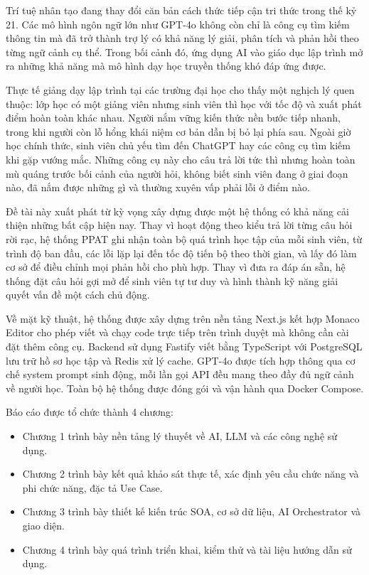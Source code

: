 \documentclass[../main.tex]{subfiles}
\begin{document}
Trí tuệ nhân tạo đang thay đổi căn bản cách thức tiếp cận tri thức trong thế kỷ 21. Các mô hình ngôn ngữ lớn như GPT-4o không còn chỉ là công cụ tìm kiếm thông tin mà đã trở thành trợ lý có khả năng lý giải, phân tích và phản hồi theo từng ngữ cảnh cụ thể. Trong bối cảnh đó, ứng dụng AI vào giáo dục lập trình mở ra những khả năng mà mô hình dạy học truyền thống khó đáp ứng được.

Thực tế giảng dạy lập trình tại các trường đại học cho thấy một nghịch lý quen thuộc: lớp học có một giảng viên nhưng sinh viên thì học với tốc độ và xuất phát điểm hoàn toàn khác nhau. Người nắm vững kiến thức nền bước tiếp nhanh, trong khi người còn lỗ hổng khái niệm cơ bản dần bị bỏ lại phía sau. Ngoài giờ học chính thức, sinh viên chủ yếu tìm đến ChatGPT hay các công cụ tìm kiếm khi gặp vướng mắc. Những công cụ này cho câu trả lời tức thì nhưng hoàn toàn mù quáng trước bối cảnh của người hỏi, không biết sinh viên đang ở giai đoạn nào, đã nắm được những gì và thường xuyên vấp phải lỗi ở điểm nào.

Đề tài này xuất phát từ kỳ vọng xây dựng được một hệ thống có khả năng cải thiện những bất cập hiện nay. Thay vì hoạt động theo kiểu trả lời từng câu hỏi rời rạc, hệ thống PPAT ghi nhận toàn bộ quá trình học tập của mỗi sinh viên, từ trình độ ban đầu, các lỗi lặp lại đến tốc độ tiến bộ theo thời gian, và lấy đó làm cơ sở để điều chỉnh mọi phản hồi cho phù hợp. Thay vì đưa ra đáp án sẵn, hệ thống đặt câu hỏi gợi mở để sinh viên tự tư duy và hình thành kỹ năng giải quyết vấn đề một cách chủ động.

Về mặt kỹ thuật, hệ thống được xây dựng trên nền tảng Next.js kết hợp Monaco Editor cho phép viết và chạy code trực tiếp trên trình duyệt mà không cần cài đặt thêm công cụ. Backend sử dụng Fastify viết bằng TypeScript với PostgreSQL lưu trữ hồ sơ học tập và Redis xử lý cache. GPT-4o được tích hợp thông qua cơ chế system prompt sinh động, mỗi lần gọi API đều mang theo đầy đủ ngữ cảnh về người học. Toàn bộ hệ thống được đóng gói và vận hành qua Docker Compose.

Báo cáo được tổ chức thành 4 chương:

\begin{itemize}
    \item Chương 1 trình bày nền tảng lý thuyết về AI, LLM và các công nghệ sử dụng.
    \item Chương 2 trình bày kết quả khảo sát thực tế, xác định yêu cầu chức năng và phi chức năng, đặc tả Use Case.
    \item Chương 3 trình bày thiết kế kiến trúc SOA, cơ sở dữ liệu, AI Orchestrator và giao diện.
    \item Chương 4 trình bày quá trình triển khai, kiểm thử và tài liệu hướng dẫn sử dụng.
\end{itemize}
\end{document}
